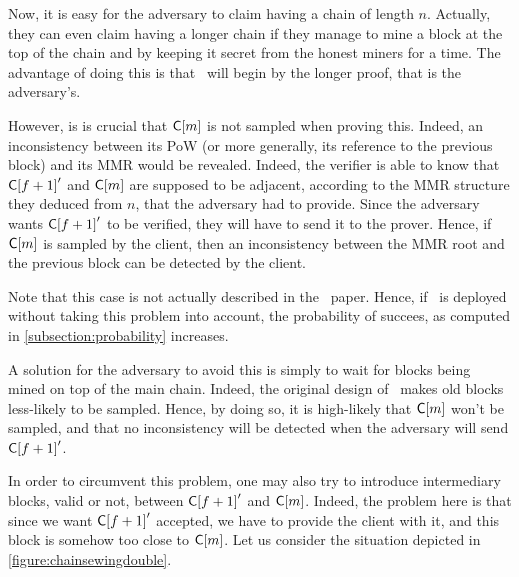       Now, it is easy for the adversary to claim having a chain of length \(n\). Actually, they can even claim having a longer chain if they manage to mine a block at the top of the chain and by keeping it secret from the honest miners for a time. The advantage of doing this is that \FC\ will begin by the longer proof, that is the adversary's.
      
      However, is is crucial that \(\mathsf{C[}m\mathsf{]}\) is not sampled when proving this. Indeed, an inconsistency between its PoW (or more generally, its reference to the previous block) and its MMR would be revealed. Indeed, the verifier is able to know that \(\mathsf{C[}f+1\mathsf{]}'\) and \(\mathsf{C[}m\mathsf{]}\) are supposed to be adjacent, according to the MMR structure they deduced from \(n\), that the adversary had to provide. Since the adversary wants \(\mathsf{C[}f+1\mathsf{]}'\) to be verified, they will have to send it to the prover. Hence, if \(\mathsf{C[}m\mathsf{]}\) is sampled by the client, then an inconsistency between the MMR root and the previous block can be detected by the client.
      
      Note that this case is not actually described in the \FC\ paper. Hence, if \FC\ is deployed without taking this problem into account, the probability of succees, as computed in \autoref{subsection:probability} increases. 
      
      A solution for the adversary to avoid this is simply to wait for blocks being mined on top of the main chain. Indeed, the original design of \FC\ makes old blocks less-likely to be sampled. Hence, by doing so, it is high-likely that \(\mathsf{C[}m\mathsf{]}\) won't be sampled, and that no inconsistency will be detected when the adversary will send \(\mathsf{C[}f+1\mathsf{]}'\).
      
      In order to circumvent this problem, one may also try to introduce intermediary blocks, valid or not, between \(\mathsf{C[}f+1\mathsf{]}'\) and \(\mathsf{C[}m\mathsf{]}\). Indeed, the problem here is that since we want \(\mathsf{C[}f+1\mathsf{]}'\) accepted, we have to provide the client with it, and this block is somehow too close to \(\mathsf{C[}m\mathsf{]}\). Let us consider the situation depicted in \autoref{figure:chainsewingdouble}.
      
